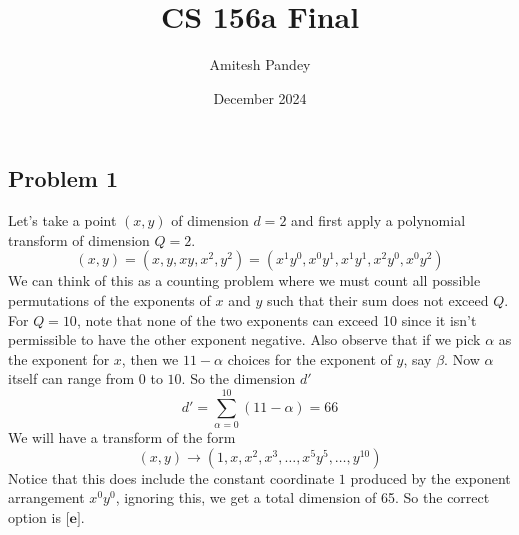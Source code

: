 \documentclass{article}
\title{CS 156a Final}
\author{Amitesh Pandey}
\date{December 2024}
\begin{document}
\maketitle
\subsection*{Problem 1}
Let's take a point $(x, y)$ of dimension $d = 2$ and first apply a polynomial transform of dimension $Q = 2$. 
\begin{equation*}
    (x, y) = (x, y, xy, x^2, y^2) = (x^1 y^0, x^0 y^1, x^1 y^1, x^2 y^0, x^0 y^2)
\end{equation*}
We can think of this as a counting problem where we must count all possible permutations of the exponents of $x$ and $y$ such that their sum does not exceed $Q$. For $Q = 10$, note that none of the two exponents can exceed 10 since it isn't permissible to have the other exponent negative. Also observe that if we pick $\alpha$ as the exponent for $x$, then we $11 - \alpha$ choices for the exponent of $y$, say $\beta$. Now $\alpha$ itself can range from $0$ to $10$. So the dimension $d'$
\begin{equation*}
    d' = \sum_{\alpha = 0}^{10} (11 - \alpha ) = 66
\end{equation*}
We will have a transform of the form
\begin{equation*}
    (x, y) \to (1, x, x^2, x^3, \dots, x^5 y^5, \dots, y^{10})
\end{equation*}
Notice that this does include the constant coordinate $1$ produced by the exponent arrangement $x^0 y^0$, ignoring this, we get a total dimension of 65. So the correct option is $\textbf{[e]}$. 
\end{document}
